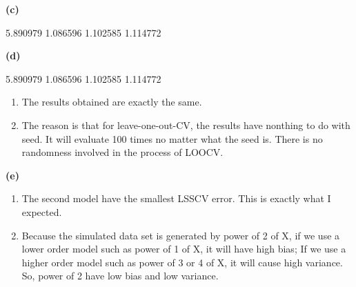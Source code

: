 \documentclass[a4paper]{article}
\renewcommand{\part}[1] {\vspace{.10in} {\bf (#1)}}
\begin{document}
\part{c}
\begin{Schunk}
\begin{Soutput}
[1] 5.890979 1.086596 1.102585 1.114772
\end{Soutput}
\end{Schunk}


\part{d}
\begin{Schunk}
\begin{Soutput}
[1] 5.890979 1.086596 1.102585 1.114772
\end{Soutput}
\end{Schunk}
{\color{red}
\begin{enumerate}
\item The results obtained are exactly the same.
\item The reason is that for leave-one-out-CV, the results have nonthing to do with seed. It will evaluate 100 times no matter what the seed is. There is no randomness involved in the process of LOOCV.
\end{enumerate}
}


\part{e}
{\color{red}
\begin{enumerate}
\item The second model have the smallest LSSCV error. This is exactly what I expected.
\item Because the simulated data set is generated by power of 2 of X, if we use a lower order model such as power of 1 of X, it will have high bias; If we use a higher order model such as power of 3 or 4 of X, it will cause high variance. So, power of 2 have low bias and low variance.
\end{enumerate}
}
\end{document}
